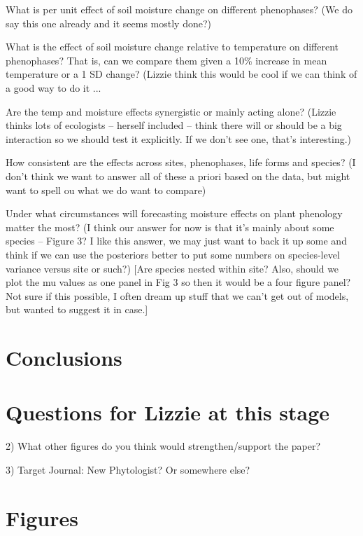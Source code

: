 \documentclass{article}
\begin{document}
\par What is per unit effect of soil moisture change on different phenophases? (We do say this one already and it seems mostly done?)
\par What is the effect of soil moisture change relative to temperature on different phenophases? That is, can we compare them given a 10\% increase in mean temperature or a 1 SD change? (Lizzie think this would be cool if we can think of a good way to do it ... 
\par Are the temp and moisture effects synergistic or mainly acting alone? (Lizzie thinks lots of ecologists -- herself included -- think there will or should be a big interaction so we should test it explicitly. If we don't see one, that's interesting.)
\par How consistent are the effects across sites, phenophases, life forms and species? (I don't think we want to answer all of these a priori based on the data, but might want to spell ou what we do want to compare)
\par Under what circumstances will forecasting moisture effects on plant phenology matter the most? (I think our answer for now is that it's mainly about some species -- Figure 3? I like this answer, we may just want to back it up some and think if we can use the posteriors better to put some numbers on species-level variance versus site or such?) [Are species nested within site? Also, should we plot the mu values as one panel in Fig 3 so then it would be a four figure panel? Not sure if this possible, I often dream up stuff that we can't get out of models, but wanted to suggest it in case.]


\section* {Conclusions}

\section* {Questions for Lizzie at this stage}

2) What other figures do you think would strengthen/support the paper?

3) Target Journal: New Phytologist? Or somewhere else?




\section*{Figures}
\end{document}
